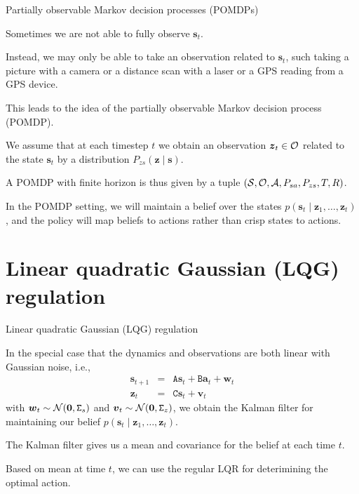 \documentclass{beamer}
\renewcommand{\vec}[1]{\boldsymbol{#1}}
\newcommand{\mat}[1]{\mathtt{#1}}
\begin{document}
\begin{frame}{Partially observable Markov decision processes (POMDPs)}

  Sometimes we are not able to fully observe $\vec{s}_t$.

  \medskip

  Instead, we may only be able to take an \alert{observation} related
  to $\vec{s}_t$, such taking a picture with a camera or a distance
  scan with a laser or a GPS reading from a GPS device.

  \medskip

  This leads to the idea of the \alert{partially observable Markov
    decision process (POMDP)}.

  \medskip

  We assume that at each timestep $t$ we obtain an observation
  $\vec{z}_t \in {\cal O}$ related to the state $\vec{s}_t$ by a distribution
  $P_{zs}(\vec{z} \mid \vec{s})$.

  \medskip

  A POMDP with finite horizon is thus given by a tuple $({\cal S},{\cal O},{\cal
    A},P_{sa},P_{zs},T,R)$.

  \medskip

  In the POMDP setting, we will maintain a \alert{belief} over the states
  $p(\vec{s}_t \mid \vec{z}_1, \ldots, \vec{z}_t)$, and the policy will map
  beliefs to actions rather than crisp states to actions.

\end{frame}

\section{Linear quadratic Gaussian (LQG) regulation}

\begin{frame}{Linear quadratic Gaussian (LQG) regulation}

  In the special case that the dynamics and observations are both linear
  with Gaussian noise, i.e.,
  \begin{eqnarray*}
    \vec{s}_{t+1} & = & \mat{A}\vec{s}_t + \mat{B}\vec{a}_t + \vec{w}_t \\
    \vec{z}_t & = & \mat{C}\vec{s}_t + \vec{v}_t
  \end{eqnarray*}
  with $\vec{w}_t \sim {\cal N}(\vec{0},\mat{\Sigma}_s)$ and
  $\vec{v}_t \sim {\cal N}(\vec{0},\mat{\Sigma}_z)$, we obtain the
  \alert{Kalman filter} for maintaining our belief $p(\vec{s}_t \mid \vec{z}_1,
  \ldots,\vec{z}_t)$.

  \medskip

  The Kalman filter gives us a mean and covariance for the belief at
  each time $t$.

  \medskip

  Based on mean at time $t$, we can use the regular LQR for
  deterimining the optimal action.

\end{frame}
\end{document}
